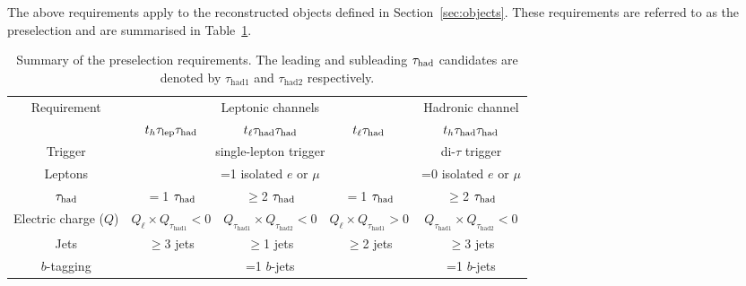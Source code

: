 \documentclass[PAPER, coverpage, atlasdraft=true, texlive=2016, UKenglish]{\ATLASLATEXPATH atlasdoc}
\providecommand{\DIFadd}[1]{{\protect\color{blue}\uwave{#1}}} %
\providecommand{\DIFdel}[1]{{\protect\color{red}\sout{#1}}}                      %
\providecommand{\DIFaddFL}[1]{\DIFadd{#1}} %
\providecommand{\DIFdelFL}[1]{\DIFdel{#1}} %
\providecommand{\DIFaddbeginFL}{} %
\providecommand{\DIFaddendFL}{} %
\providecommand{\DIFdelbeginFL}{} %
\providecommand{\DIFdelendFL}{} %
\begin{document}
The above requirements apply to the reconstructed objects defined in Section~\ref{sec:objects}.
These requirements are referred to as the preselection and are summarised in Table~\ref{tab:preselection}. 

\begin{table}[t!]
\caption{\DIFdelbeginFL %
\DIFdelendFL \DIFaddbeginFL \small{Summary of the preselection requirements. 
The leading and subleading $\tau_{\mathrm{had}}$ candidates are denoted by $\tau_{\mathrm{had1}}$ and $\tau_{\mathrm{had2}}$ respectively.}\DIFaddendFL }
\begin{center}
\begin{tabular}{c|ccc|c}
\toprule\toprule
\multirow{2}{*}{Requirement} &  \DIFdelbeginFL %
\DIFdelendFL \DIFaddbeginFL \multicolumn{3}{c|}{Leptonic channels}  \DIFaddendFL & \DIFdelbeginFL %
\DIFdelendFL \DIFaddbeginFL \multicolumn{1}{c}{Hadronic channel} \DIFaddendFL \\ 
& $t_h\tau_{\mathrm{lep}} \tau_{\mathrm{had}}$ & $t_{\ell}\tau_{\mathrm{had}} \tau_{\mathrm{had}}$ &  $t_{\ell}\tau_{\mathrm{had}}$ & $t_h\tau_{\mathrm{had}} \tau_{\mathrm{had}}$\\
\midrule
Trigger & \multicolumn{3}{c|}{single-lepton trigger} & di-$\tau$ trigger  \\
Leptons  & \multicolumn{3}{c|}{=1 isolated $e$ or $\mu$}  & =0 isolated $e$ or $\mu$ \\
$\tau_{\mathrm{had}}$  & $=$1 $\tau_{\mathrm{had}}$ & \DIFdelbeginFL \DIFdelFL{$\geq$}\DIFdelendFL \DIFaddbeginFL \DIFaddFL{$=$}\DIFaddendFL 2 $\tau_{\mathrm{had}}$ & $=$1 $\tau_{\mathrm{had}}$ & \DIFdelbeginFL \DIFdelFL{$\geq$}\DIFdelendFL \DIFaddbeginFL \DIFaddFL{$=$}\DIFaddendFL 2 $\tau_{\mathrm{had}}$ \\
Electric charge ($Q$) & \DIFdelbeginFL \DIFdelFL{$Q_\ell \times Q_{\tau_{\mathrm{had1}}} < 0$ }\DIFdelendFL \DIFaddbeginFL \DIFaddFL{$Q_\ell \times Q_{\tau_{\mathrm{had1}}} = -1$ }\DIFaddendFL & \DIFdelbeginFL \DIFdelFL{$Q_{\tau_{\mathrm{had1}}} \times Q_{\tau_{\mathrm{had2}}} < 0$ }\DIFdelendFL \DIFaddbeginFL \DIFaddFL{$Q_{\tau_{\mathrm{had1}}} \times Q_{\tau_{\mathrm{had2}}} = -1$ }\DIFaddendFL & \DIFdelbeginFL \DIFdelFL{$Q_\ell \times Q_{\tau_{\mathrm{had1}}} > 0$ }\DIFdelendFL \DIFaddbeginFL \DIFaddFL{$Q_\ell \times Q_{\tau_{\mathrm{had1}}} = 1$ }\DIFaddendFL & \DIFdelbeginFL \DIFdelFL{$Q_{\tau_{\mathrm{had1}}} \times Q_{\tau_{\mathrm{had2}}} < 0$ }\DIFdelendFL \DIFaddbeginFL \DIFaddFL{$Q_{\tau_{\mathrm{had1}}} \times Q_{\tau_{\mathrm{had2}}} = -1$ }\DIFaddendFL \\
Jets  &   $\geq$3 jets & $\geq$1 jets & $\geq$2 jets & $\geq$3 jets \\
$b$-tagging & \multicolumn{3}{c|}{=1 $b$-jets} & =1 $b$-jets\\
\bottomrule\bottomrule
\end{tabular}
\label{tab:preselection}
\end{center}
\end{table}
\end{document}
